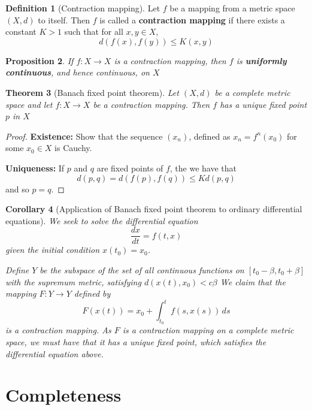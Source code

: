 \documentclass[10pt, oneside, reqno]{amsart}
\theoremstyle{plain}%
\newtheorem{thm}{Theorem}[section]
\newtheorem{prop}[thm]{Proposition}
\newtheorem{cor}[thm]{Corollary}
\theoremstyle{definition}
\newtheorem{defn}[thm]{Definition}
\theoremstyle{remark}
\newcommand{\met}{(X,d)}
\begin{document}
\begin{defn}[Contraction mapping]
    Let $f$ be a mapping from a metric space $\met$ to itself.  Then $f$ is called a \textbf{contraction mapping} if there exists a constant $K > 1$ such that for all $x,y \in X$, \[
        d(f(x), f(y)) \leq K (x,y)
    \] 
\end{defn}

\begin{prop}
    If $f: X \rightarrow X$ is a contraction mapping, then $f$ is \textbf{uniformly continuous}, and hence continuous, on $X$
\end{prop}



\begin{thm}[Banach fixed point theorem]
    Let $\met$ be a complete metric space and let $f: X \rightarrow X$ be a contraction mapping.  Then $f$ has a unique fixed point $p$ in $X$
\end{thm}

\begin{proof}
    \textbf{Existence:} Show that the sequence $(x_n)$, defined as $x_n = f^n(x_0)$ for some $x_0 \in X$ is Cauchy.
    
    \textbf{Uniqueness:} If $p$ and $q$ are fixed points of $f$, the we have that \[
            d(p,q) = d(f(p), f(q)) \leq K d(p,q)
            \] and so $p = q$.
\end{proof}

\begin{cor}[Application of Banach fixed point theorem to ordinary differential equations]
    We seek to solve the differential equation \[
        \frac{dx}{dt} = f(t,x)
    \] given the initial condition $x(t_0) = x_0$.
    
    Define $Y$ be the subspace of the set of all continuous functions on $[t_0 - \beta, t_0 + \beta]$ with the supremum metric, satisfying $d(x(t), x_0) < c \beta$
    We claim that the mapping $F: Y \rightarrow Y$ defined by\[
        F(x(t)) = x_0 + \int_{t_0}^t f(s, x(s)) \, ds
    \] is a contraction mapping.  As $F$ is a contraction mapping on a complete metric space, we must have that it has a unique fixed point, which satisfies the differential equation above.
\end{cor}


\section{Completeness} %
\label{sec:completeness}
\end{document}
